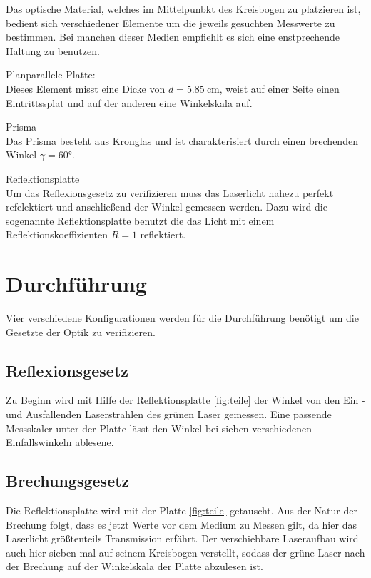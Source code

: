 Das optische Material, welches im Mittelpunbkt des Kreisbogen zu platzieren ist, bedient sich verschiedener Elemente um 
die jeweils gesuchten Messwerte zu bestimmen. Bei manchen dieser Medien empfiehlt es sich eine enstprechende Haltung zu benutzen.
\begin{description}
    \item Planparallele Platte: \\
    Dieses Element misst eine Dicke von $d = \SI{5.85}{\cm}$, weist auf einer Seite einen Eintrittssplat und auf der anderen 
    eine Winkelskala auf.
    \item Prisma \\
    Das Prisma besteht aus Kronglas und ist charakterisiert durch einen brechenden Winkel $\gamma = 60 \si{\degree}$.
    \item Reflektionsplatte \label{lol}\\ 
    Um das Reflexionsgesetz zu verifizieren muss das Laserlicht nahezu perfekt refelektiert und anschließend der Winkel
    gemessen werden. Dazu wird die sogenannte Reflektionsplatte benutzt die das Licht mit einem Reflektionskoeffizienten $R= 1$
    reflektiert.
\end{description}

\section{Durchführung}
Vier verschiedene Konfigurationen werden für die Durchführung benötigt um die Gesetzte der Optik zu verifizieren.

\subsection{Reflexionsgesetz}
Zu Beginn wird mit Hilfe der Reflektionsplatte \ref{fig:teile} der Winkel von den Ein - und Ausfallenden Laserstrahlen des grünen Laser gemessen. 
Eine passende Messskaler unter der Platte lässt den Winkel bei sieben verschiedenen Einfallswinkeln ablesene.

\subsection{Brechungsgesetz}
Die Reflektionsplatte wird mit der Platte \ref{fig:teile} getauscht. Aus der Natur der Brechung folgt, dass es jetzt Werte 
vor dem Medium zu Messen gilt, da hier das Laserlicht größtenteils Transmission erfährt.
Der verschiebbare Laseraufbau wird auch hier sieben mal auf seinem Kreisbogen verstellt, sodass der grüne Laser 
nach der Brechung auf der Winkelskala der Platte abzulesen ist. 

